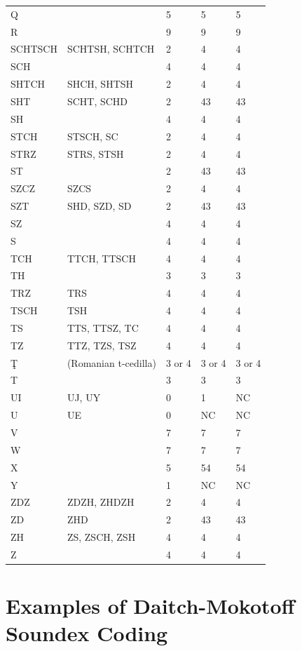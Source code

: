 \documentclass[12pt,a4paper]{article}
\begin{document}
\begin{longtable}{|l|l|l|l|l|}
		Q &   & 5 & 5 & 5 \\
		R &   & 9 & 9 & 9 \\
		SCHTSCH & SCHTSH, SCHTCH & 2 & 4 & 4 \\
		SCH &   & 4 & 4 & 4 \\
		SHTCH & SHCH, SHTSH & 2 & 4 & 4 \\
		SHT & SCHT, SCHD & 2 & 43 & 43 \\
		SH &   & 4 & 4 & 4 \\
		STCH & STSCH, SC & 2 & 4 & 4 \\
		STRZ & STRS, STSH & 2 & 4 & 4 \\
		ST &   & 2 & 43 & 43 \\
		SZCZ & SZCS & 2 & 4 & 4 \\
		SZT & SHD, SZD, SD & 2 & 43 & 43 \\
		SZ &   & 4 & 4 & 4 \\
		S &   & 4 & 4 & 4 \\
		TCH & TTCH, TTSCH & 4 & 4 & 4 \\
		TH &   & 3 & 3 & 3 \\
		TRZ & TRS & 4 & 4 & 4 \\
		TSCH & TSH & 4 & 4 & 4 \\
		TS & TTS, TTSZ, TC & 4 & 4 & 4 \\
		TZ & TTZ, TZS, TSZ & 4 & 4 & 4 \\
		Ţ & (Romanian t-cedilla) & 3 or 4 & 3 or 4 & 3 or 4 \\
		T &   & 3 & 3 & 3 \\
		UI & UJ, UY & 0 & 1 & NC \\
		U & UE & 0 & NC & NC \\
		V &   & 7 & 7 & 7 \\
		W &   & 7 & 7 & 7 \\
		X &   & 5 & 54 & 54 \\
		Y &   & 1 & NC & NC \\
		ZDZ & ZDZH, ZHDZH & 2 & 4 & 4 \\
		ZD & ZHD & 2 & 43 & 43 \\
		ZH & ZS, ZSCH, ZSH & 4 & 4 & 4 \\
		Z &   & 4 & 4 & 4 \\
		\hline
	\end{longtable}
	
		 \newpage
		 
	\section{Examples of Daitch-Mokotoff Soundex Coding}
\end{document}
